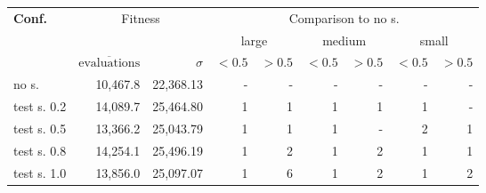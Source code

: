 \begin{tabular}{ l r r | rr | rr | rr }
\hline 
\textbf{Conf.} & \multicolumn{2}{c|}{Fitness} & \multicolumn{6}{c}{Comparison to no s.} \\ 
  &   &   & \multicolumn{2}{c}{large} & \multicolumn{2}{c}{medium} & \multicolumn{2}{c}{small} \\ 
  & $\overline{\text{evaluations}}$ & $\sigma$ & $<0.5$ & $>0.5$ & $<0.5$ & $>0.5$ & $<0.5$ & $>0.5$ \\ 
\hline 
no s. & 10,467.8 & 22,368.13 & - & - & - & - & - & - \\ 
test s. 0.2 & 14,089.7 & 25,464.80& 1& 1& 1& 1& 1& - \\ 
test s. 0.5 & 13,366.2 & 25,043.79& 1& 1& 1& -& 2& 1 \\ 
test s. 0.8 & 14,254.1 & 25,496.19& 1& 2& 1& 2& 1& 1 \\ 
test s. 1.0 & 13,856.0 & 25,097.07& 1& 6& 1& 2& 1& 2 \\ 
\hline 
\end{tabular}